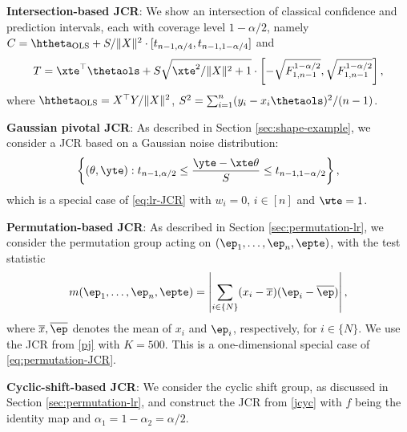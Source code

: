 \documentclass[english]{article}
\begin{document}
\begin{compactitem}
  \item {\bf Intersection-based JCR}: We show an intersection of classical confidence and prediction intervals, each with coverage level $1-\alpha/2$, namely
$
C = \htheta_{\mathrm{OLS}} + S/\|X\|^2\cdot [t_{n-1,\alpha/4},t_{n-1,1-\alpha/4}]$
and
$$
T = \xte^\top\thetaols + S \sqrt{\xte^2/\|X\|^2+1} \cdot 
\left[ - \sqrt{F_{1,n-1}^{1 - \alpha/2}},  \sqrt{F_{1,n-1}^{1 - \alpha/2}}\right],
$$
where $\htheta_{\mathrm{OLS}} = X^\top Y/\|X\|^2$, $S^2 = \sum_{i=1}^n (y_i - x_i\thetaols)^2 /(n-1)$.
    \item 
    {\bf Gaussian pivotal JCR}:
    As described in Section \ref{sec:shape-example}, we consider a JCR 
    based on a Gaussian noise distribution:
    $$
    \left\{ (\theta,\yte): t_{n-1, \alpha/2} \leq \frac{\yte - \xte \theta}{S} \leq t_{n-1, 1-\alpha/2} \right\},
    $$
    which is a special case of \eqref{eq:lr-JCR} 
     with $w_i = 0$, $i\in [n]$ and $\wte = 1$.


    \item {\bf Permutation-based JCR}: As described in Section \ref{sec:permutation-lr},  we consider the permutation group acting on $(\ep_1,\ldots,\ep_n,\epte)$, with the test statistic 
    \begin{align}\label{eq:pb-m}
     m(\ep_1,\ldots,\ep_n,\epte) = \left|\sum_{i\in \{N\}} (x_i - \overline{x})(\ep_i - \overline{\ep})\right|,   
    \end{align}
    where $\overline{x}, \overline{\ep}$ denotes the mean of $x_i$ and $\ep_i$, respectively, for $i\in \{N\}$. 
    We  use the JCR from \eqref{pj} with $K=500$.
    This is a one-dimensional special case of \eqref{eq:permutation-JCR}.


    \item
    {\bf Cyclic-shift-based JCR}:
    We consider the cyclic shift group, as discussed in Section \ref{sec:permutation-lr}, 
    and construct the JCR from \eqref{jcyc} with $f$ being the identity map and $\alpha_1 = 1-\alpha_2 = \alpha/2$.

    
\end{compactitem}    
\end{document}
